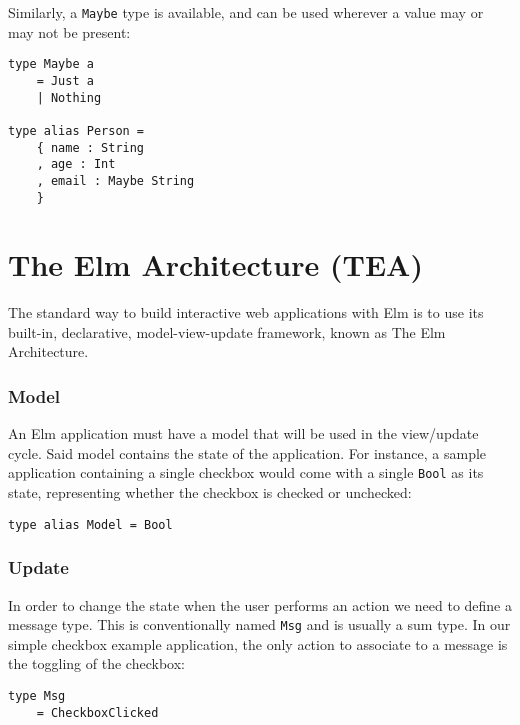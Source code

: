 Similarly, a \texttt{Maybe} type is available, and can be used wherever a value may or may not be present:
\begin{verbatim}
type Maybe a
    = Just a
    | Nothing

type alias Person =
    { name : String
    , age : Int
    , email : Maybe String
    }
\end{verbatim}

\section{The Elm Architecture (TEA)}

The standard way to build interactive web applications with Elm is to use its built-in, declarative, model-view-update framework, known as The Elm Architecture.

\subsubsection{Model}
An Elm application must have a model that will be used in the view/update cycle. Said model contains the state of the application. For instance, a sample application containing a single checkbox would come with a single \texttt{Bool} as its state, representing whether the checkbox is checked or unchecked:

\begin{verbatim}
type alias Model = Bool
\end{verbatim}

\subsubsection{Update}
In order to change the state when the user performs an action we need to define a message type. This is conventionally named \texttt{Msg} and is usually a sum type. In our simple checkbox example application, the only action to associate to a message is the toggling of the checkbox:
\begin{verbatim}
type Msg
    = CheckboxClicked
\end{verbatim}

